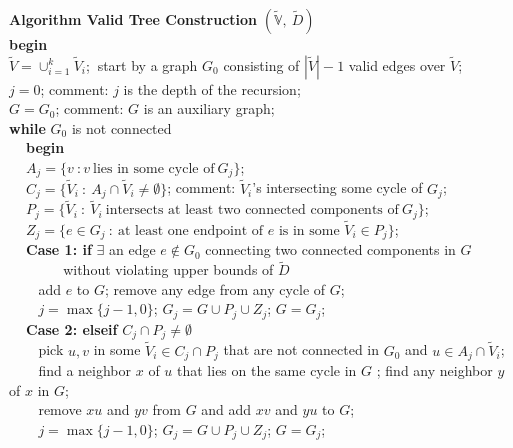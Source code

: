 \documentclass[12pt,a4paper]{article}
\theoremstyle{definition}
\theoremstyle{plain}
\begin{document}
\noindent
{\bf Algorithm Valid Tree Construction}
$(\widetilde{\mathbb V}, ~ \widetilde{D})$\\
{\bf begin}\\
$\widetilde{V} \! = \! \cup_{i=1}^k \widetilde{V}_{i}$;$~$
start by a graph $G_0$ consisting of
$|\widetilde{V}| \! - \! 1$ valid edges over $\widetilde{V}$;\\
$j\! = \! 0$; comment: $j$ is the depth of the recursion;\\ 
$G \! = \! G_0$; comment: $G$ is an auxiliary graph;\\
{\bf while} $G_0$ is not connected\\
$~~~~$ {\bf begin}\\
$~~~~$ $A_j \! = \! \{ v~:v~\mbox{lies in some cycle of}~G_j \}$;\\
$~~~~$ $C_j \! = \! \{ \widetilde{V}_{i}~:~A_j\cap\widetilde{V}_{i} \neq \emptyset \}$;
comment: $\widetilde{V}_{i}$'s intersecting some cycle of $G_j$;\\
$~~~~$ $P_j \! = \! \{ \widetilde{V}_{i}~:~\widetilde{V}_{i}~
       \mbox{intersects at least two connected components of}~G_j \}$;\\
$~~~~$ $Z_j \! = \! \{ e\in G_j~:~
     \mbox{at least one endpoint of $e$ is in some $\widetilde{V}_{i}\in P_j$}
               \}$;\\
$~~~~$ {\bf Case 1: if}
       $\exists$ an edge $e\not\in G_0$
                 connecting two connected components in $G$\\
$~~~~~~~~~~~~~~~~$ without violating upper bounds of $\widetilde{D}$ \\
$~~~~~~~~$ add $e$ to $G$; remove any edge from any cycle of $G$;\\
$~~~~~~~~$ $j \! = \! \max \{ j\! - \! 1 , 0 \}$;
           $G_j \! = \! G \cup P_j \cup Z_j$; $G \! = \! G_j$;\\
$~~~~$ {\bf Case 2: elseif} $C_j \cap P_j \! \neq \! \emptyset$\\
$~~~~~~~~$ pick $u,v$ in some $\widetilde{V}_{i} \in C_j \cap P_j$
           that are not connected in $G_0$ and $u\in A_j \cap \widetilde{V}_{i} $;\\
$~~~~~~~~$ find a neighbor $x$ of $u$ that lies on the same cycle in $G$ ;
           find any neighbor $y$ of $x$ in $G$;\\
$~~~~~~~~$ remove $xu$ and $yv$ from $G$ and add $xv$ and $yu$ to $G$;\\
$~~~~~~~~$ $j \! = \! \max \{ j\! - \! 1 , 0 \}$;
           $G_j \! = \! G \cup P_j \cup Z_j$; $G \! = \! G_j$;\\
\end{document}
